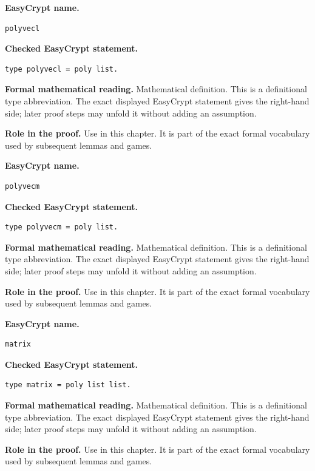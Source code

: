 \begin{formaldefinition}
\noindent\textbf{EasyCrypt name.}
\begin{lstlisting}[language=EasyCrypt,basicstyle=\ttfamily\scriptsize]
polyvecl
\end{lstlisting}
\noindent\textbf{Checked EasyCrypt statement.}
\begin{lstlisting}[language=EasyCrypt,basicstyle=\ttfamily\scriptsize]
type polyvecl = poly list.
\end{lstlisting}
\noindent\textbf{Formal mathematical reading.}
Mathematical definition. This is a definitional type abbreviation.  The exact displayed EasyCrypt statement gives the right-hand side; later proof steps may unfold it without adding an assumption.

\noindent\textbf{Role in the proof.}
Use in this chapter. It is part of the exact formal vocabulary used by subsequent lemmas and games.

\end{formaldefinition}

\begin{formaldefinition}
\noindent\textbf{EasyCrypt name.}
\begin{lstlisting}[language=EasyCrypt,basicstyle=\ttfamily\scriptsize]
polyvecm
\end{lstlisting}
\noindent\textbf{Checked EasyCrypt statement.}
\begin{lstlisting}[language=EasyCrypt,basicstyle=\ttfamily\scriptsize]
type polyvecm = poly list.
\end{lstlisting}
\noindent\textbf{Formal mathematical reading.}
Mathematical definition. This is a definitional type abbreviation.  The exact displayed EasyCrypt statement gives the right-hand side; later proof steps may unfold it without adding an assumption.

\noindent\textbf{Role in the proof.}
Use in this chapter. It is part of the exact formal vocabulary used by subsequent lemmas and games.

\end{formaldefinition}

\begin{formaldefinition}
\noindent\textbf{EasyCrypt name.}
\begin{lstlisting}[language=EasyCrypt,basicstyle=\ttfamily\scriptsize]
matrix
\end{lstlisting}
\noindent\textbf{Checked EasyCrypt statement.}
\begin{lstlisting}[language=EasyCrypt,basicstyle=\ttfamily\scriptsize]
type matrix = poly list list.
\end{lstlisting}
\noindent\textbf{Formal mathematical reading.}
Mathematical definition. This is a definitional type abbreviation.  The exact displayed EasyCrypt statement gives the right-hand side; later proof steps may unfold it without adding an assumption.

\noindent\textbf{Role in the proof.}
Use in this chapter. It is part of the exact formal vocabulary used by subsequent lemmas and games.

\end{formaldefinition}

